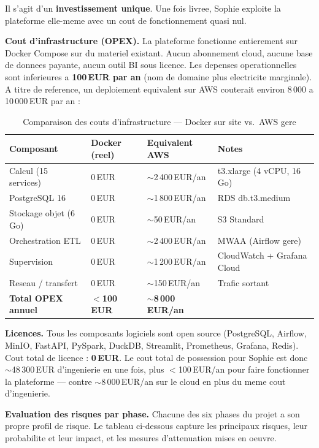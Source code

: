 \documentclass[a4paper,11pt,oneside,openany]{report}
\begin{document}
Il s'agit d'un \textbf{investissement unique}. Une fois livree,
Sophie exploite la plateforme elle-meme avec un cout de
fonctionnement quasi nul.

\textbf{Cout d'infrastructure (OPEX).} La plateforme fonctionne
entierement sur Docker Compose sur du materiel existant. Aucun
abonnement cloud, aucune base de donnees payante, aucun outil BI
sous licence. Les depenses operationnelles sont inferieures a
\textbf{100\,EUR par an} (nom de domaine plus electricite marginale).
A titre de reference, un deploiement equivalent sur AWS couterait
environ 8\,000 a 10\,000\,EUR par an :

\begin{table}[H]
\centering
\caption{Comparaison des couts d'infrastructure --- Docker sur site vs.\ AWS gere}
\label{tab:capex}
\begin{tabularx}{\textwidth}{L{4cm} C{2.5cm} C{2.5cm} L{3.5cm}}
\toprule
\textbf{Composant} & \textbf{Docker (reel)} & \textbf{Equivalent AWS} & \textbf{Notes} \\
\midrule
Calcul (15 services) & 0\,EUR & $\sim$2\,400\,EUR/an & t3.xlarge (4 vCPU, 16\,Go) \\
PostgreSQL 16 & 0\,EUR & $\sim$1\,800\,EUR/an & RDS db.t3.medium \\
Stockage objet (6\,Go) & 0\,EUR & $\sim$50\,EUR/an & S3 Standard \\
Orchestration ETL & 0\,EUR & $\sim$2\,400\,EUR/an & MWAA (Airflow gere) \\
Supervision & 0\,EUR & $\sim$1\,200\,EUR/an & CloudWatch + Grafana Cloud \\
Reseau / transfert & 0\,EUR & $\sim$150\,EUR/an & Trafic sortant \\
\midrule
\textbf{Total OPEX annuel} & \textbf{$<$100\,EUR} & \textbf{$\sim$8\,000\,EUR/an} & \\
\bottomrule
\end{tabularx}
\end{table}

\textbf{Licences.} Tous les composants logiciels sont open source
(PostgreSQL, Airflow, MinIO, FastAPI, PySpark, DuckDB, Streamlit,
Prometheus, Grafana, Redis). Cout total de licence :
\textbf{0\,EUR}. Le cout total de possession pour Sophie est donc
$\sim$48\,300\,EUR d'ingenierie en une fois, plus $<$100\,EUR/an
pour faire fonctionner la plateforme --- contre $\sim$8\,000\,EUR/an
sur le cloud en plus du meme cout d'ingenierie.

\textbf{Evaluation des risques par phase.} Chacune des six phases du
projet a son propre profil de risque. Le tableau ci-dessous capture les
principaux risques, leur probabilite et leur impact, et les mesures
d'attenuation mises en oeuvre.
\end{document}
